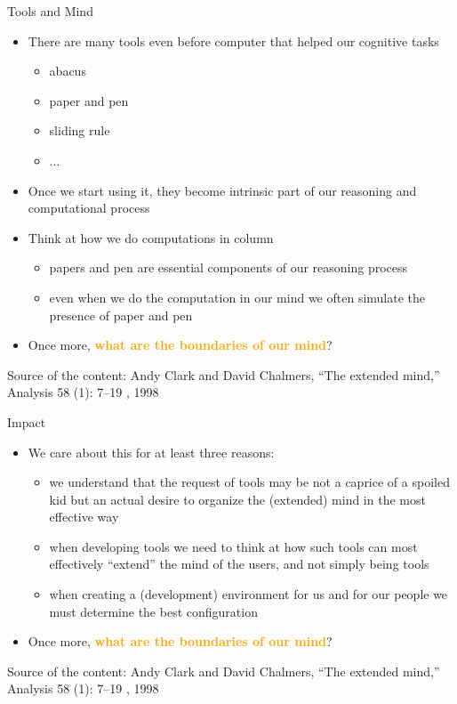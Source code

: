 \documentclass{beamer}
\begin{document}
\begin{frame}
{\centerline{Tools and Mind}}
\begin{itemize}
    \item There are many tools even before computer that helped our cognitive tasks
    \begin{itemize}
        \item abacus
        \item paper and pen
        \item sliding rule
        \item $\ldots{}$
            \end{itemize}
    \item Once we start using it, they become intrinsic part of our reasoning and computational process
    \item Think at how we do computations in column
           \begin{itemize}
        		\item papers and pen are essential components of our reasoning process
		\item even when we do the computation in our mind we often simulate the presence of paper and pen
	   \end{itemize} 
    \item Once more, \textcolor{orange}{\bf what are the boundaries of our mind}?
\end{itemize} 

\begin{center}
    \tiny{Source of the content: Andy Clark and David Chalmers, ``The extended mind,'' Analysis 58 (1): 7--19 , 1998}
\end{center}

\end{frame}

\begin{frame}
{\centerline{Impact}}
\begin{itemize}
    \item We care about this for at least three reasons:
    \begin{itemize}
        \item we understand that the request of tools may be not a caprice of a spoiled kid but an actual desire to organize the (extended) mind in the most effective way
        \item when developing tools we need to think at how such tools can most effectively ``extend'' the mind of the users, and not simply being tools
        \item when creating a (development) environment for us and for our people we must determine the best configuration
    \end{itemize}
    \item Once more, \textcolor{orange}{\bf what are the boundaries of our mind}?
\end{itemize} 

\begin{center}
    \tiny{Source of the content: Andy Clark and David Chalmers, ``The extended mind,'' Analysis 58 (1): 7--19 , 1998}
\end{center}

\end{frame}
\end{document}
